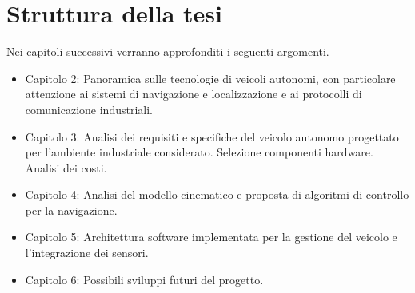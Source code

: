 \section{Struttura della tesi}
Nei capitoli successivi verranno approfonditi i seguenti argomenti.
\begin{itemize}
    \item Capitolo 2: Panoramica sulle tecnologie di veicoli autonomi, con particolare attenzione ai sistemi di navigazione e localizzazione e ai protocolli di comunicazione industriali.
    \item Capitolo 3: Analisi dei requisiti e specifiche del veicolo autonomo progettato per l'ambiente industriale considerato. Selezione componenti hardware. Analisi dei costi.
    \item Capitolo 4: Analisi del modello cinematico e proposta di algoritmi di controllo per la navigazione.
    \item Capitolo 5: Architettura software implementata per la gestione del veicolo e l'integrazione dei sensori.
    \item Capitolo 6: Possibili sviluppi futuri del progetto.
\end{itemize}
